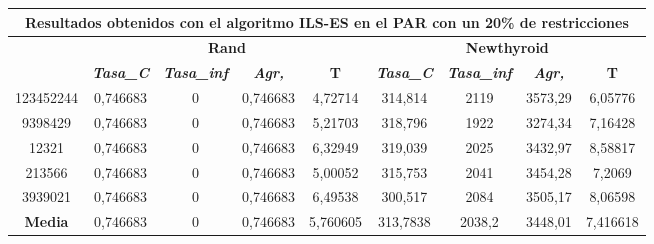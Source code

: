 \documentclass[12pt, spanish]{article}
\begin{document}
\begin{table}[H]
\begin{tabular}{|c|c|c|c|c|c|c|c|c|}
\hline
\multicolumn{9}{|c|}{\textbf{Resultados obtenidos con el algoritmo ILS-ES en el PAR con un 20\% de restricciones}}                                                                                                \\ \hline
\multirow{2}{*}{} & \multicolumn{4}{c|}{\textbf{Rand}}                                                            & \multicolumn{4}{c|}{\textbf{Newthyroid}}                                                      \\ \cline{2-9} 
                  & \textit{\textbf{Tasa\_C}} & \textit{\textbf{Tasa\_inf}} & \textit{\textbf{Agr,}} & \textbf{T} & \textit{\textbf{Tasa\_C}} & \textit{\textbf{Tasa\_inf}} & \textit{\textbf{Agr,}} & \textbf{T} \\ \hline
123452244         & 0,746683                  & 0                           & 0,746683               & 4,72714    & 314,814                   & 2119                        & 3573,29                & 6,05776    \\ \hline
9398429           & 0,746683                  & 0                           & 0,746683               & 5,21703    & 318,796                   & 1922                        & 3274,34                & 7,16428    \\ \hline
12321             & 0,746683                  & 0                           & 0,746683               & 6,32949    & 319,039                   & 2025                        & 3432,97                & 8,58817    \\ \hline
213566            & 0,746683                  & 0                           & 0,746683               & 5,00052    & 315,753                   & 2041                        & 3454,28                & 7,2069     \\ \hline
3939021           & 0,746683                  & 0                           & 0,746683               & 6,49538    & 300,517                   & 2084                        & 3505,17                & 8,06598    \\ \hline
\textbf{Media}    & 0,746683                  & 0                           & 0,746683               & 5,760605   & 313,7838                  & 2038,2                      & 3448,01                & 7,416618   \\ \hline
\end{tabular}
\end{table}
\end{document}
